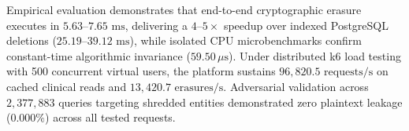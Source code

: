 Empirical evaluation demonstrates that end-to-end cryptographic erasure executes in $5.63\text{--}7.65\text{~ms}$, delivering a $4\text{--}5\times$ speedup over indexed PostgreSQL deletions ($25.19\text{--}39.12\text{~ms}$), while isolated CPU microbenchmarks confirm constant-time algorithmic invariance ($59.50\,\mu\text{s}$). Under distributed k6 load testing with 500 concurrent virtual users, the platform sustains $96{,}820.5\text{~requests/s}$ on cached clinical reads and $13{,}420.7\text{~erasures/s}$. Adversarial validation across $2{,}377{,}883$ queries targeting shredded entities demonstrated zero plaintext leakage ($0.000\%$) across all tested requests.

\vfill